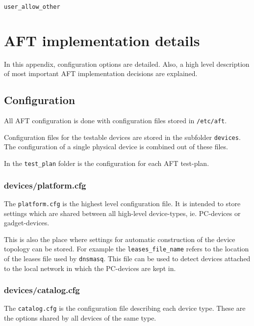 \documentclass[a4paper,11pt]{article}
\newcommand{\cmd}[1]{\texttt{#1}}
\begin{document}
\begin{enumerate}
\begin{lstlisting}
user_allow_other
\end{lstlisting}



\end{enumerate}





\newpage
\appendix
\section{AFT implementation details}
\label{app:aft}

In this appendix, configuration options are detailed. Also, a high level description of most important AFT implementation decisions are explained. 

\subsection{Configuration}

All AFT configuration is done with configuration files stored in \cmd{/etc/aft}.

Configuration files for the testable devices are stored in the subfolder \cmd{devices}. The configuration of a single physical device is combined out of these files.

In the \cmd{test\_plan} folder is the configuration for each AFT test-plan.

\subsubsection*{devices/platform.cfg}
The \cmd{platform.cfg} is the highest level configuration file. It is intended to store settings which are shared between all high-level device-types, ie. PC-devices or gadget-devices.

This is also the place where settings for automatic construction of the device topology can be stored. For example the \cmd{leases\_file\_name} refers to the location of the leases file used by \cmd{dnsmasq}. This file can be used to detect devices attached to the local network in which the PC-devices are kept in.

\subsubsection*{devices/catalog.cfg}
The \cmd{catalog.cfg} is the configuration file describing each device type. These are the options shared by all devices of the same type.
\end{document}
